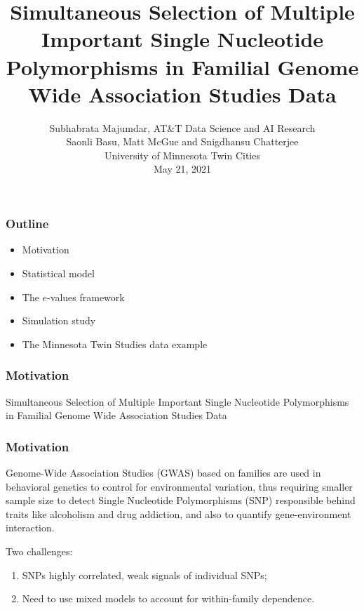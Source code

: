 \documentclass[handout,10pt]{beamer}
\title[Simultaneous Selection of Multiple SNPs]
{
Simultaneous Selection of Multiple Important Single Nucleotide Polymorphisms in Familial Genome Wide Association Studies Data}
\author[Majumdar {\it et al}]{Subhabrata Majumdar, AT\&T Data Science and AI Research\\
Saonli Basu, Matt McGue and Snigdhansu Chatterjee\\
University of Minnesota Twin Cities\\
\vspace{1em}
May 21, 2021}
\date [May 21, 2021]
\begin{document}

\frame{ \titlepage}


\begin{frame}
\frametitle{Outline}
\begin{itemize}
\item Motivation

\item Statistical model

\item The $e$-values framework

\item Simulation study

\item The Minnesota Twin Studies data example
\end{itemize}
\end{frame}


\begin{frame}
\frametitle{Motivation}

\centering
{\large
{\colrbf Simultaneous} Selection of Multiple Important Single Nucleotide Polymorphisms in {\colrbf Familial} Genome Wide Association Studies Data
}
\end{frame}

\begin{frame}
\frametitle{Motivation}

\vspace{1em}
Genome-Wide Association Studies (GWAS) based on families are used in behavioral genetics to control for environmental variation, thus requiring smaller sample size to detect Single Nucleotide Polymorphisms (SNP) responsible behind traits like alcoholism and drug addiction, and also to quantify gene-environment interaction.

\vspace{1em}
Two challenges:

\begin{enumerate}
\item SNPs highly correlated, weak signals of individual SNPs;

\item Need to use mixed models to account for within-family dependence.
\end{enumerate}

\end{frame}
\end{document}
